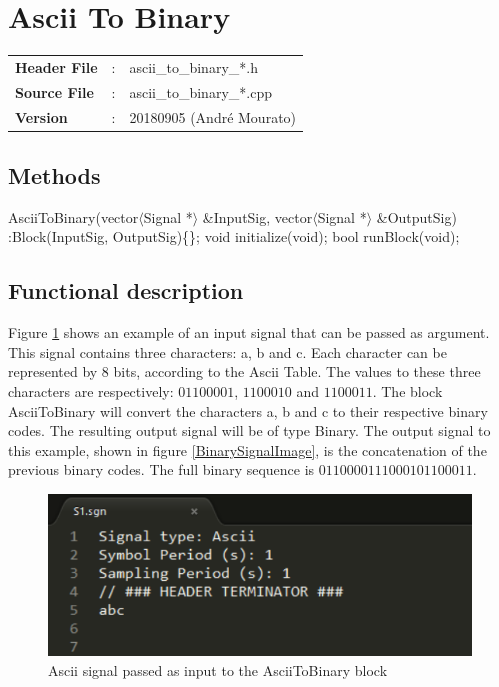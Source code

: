 \clearpage

\section{Ascii To Binary}

\begin{tcolorbox}	
	\begin{tabular}{p{2.75cm} p{0.2cm} p{10.5cm}} 	
		\textbf{Header File}   &:& ascii\_to\_binary\_*.h \\
		\textbf{Source File}   &:& ascii\_to\_binary\_*.cpp \\
        \textbf{Version}       &:& 20180905 (Andr\'e Mourato)
	\end{tabular}
\end{tcolorbox}

\subsection*{Methods}

AsciiToBinary(vector$\langle$Signal *$\rangle$ \&InputSig, vector$\langle$Signal *$\rangle$ \&OutputSig) :Block(InputSig, OutputSig)\{\};
\bigbreak
void initialize(void);
\bigbreak
bool runBlock(void);
\bigbreak

\subsection*{Functional description}

Figure \ref{AsciiSignalImage} shows an example of an input signal that can be passed as argument. This signal contains three characters: a, b and c. Each character can be represented by 8 bits, according to the Ascii Table. The values to these three characters are respectively: $01100001$, $1100010$ and $1100011$.
The block AsciiToBinary will convert the characters a, b and c to their respective binary codes. The resulting output signal will be of type Binary. The output signal to this example, shown in figure \ref{BinarySignalImage}, is the concatenation of the previous binary codes. The full binary sequence is $0110000111000101100011$.

\begin{figure}[h]
	\centering
\includegraphics[width=.7\linewidth]{./lib/ascii_to_binary/figures/ascii_signal.png}
\caption{Ascii signal passed as input to the AsciiToBinary block}\label{AsciiSignalImage}
\end{figure}

